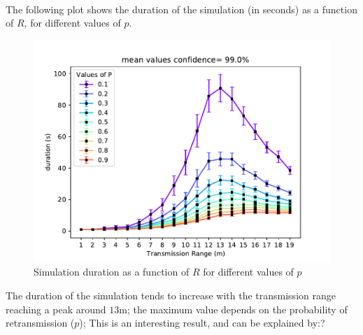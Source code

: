 \\
The following plot shows the duration of the simulation (in seconds) as a
function of $R$, for different values of $p$.
\begin{figure}[H]
    \begin{center}
        \includegraphics[scale=.7]{img/Big_DurRange_mean.pdf}
    \end{center}
    \vspace*{-0.5cm}
    \caption{Simulation duration as a function of $R$ for different values of $p$}
    \label{fig:floorplancoverage4}
\end{figure}
\noindent
The duration of the simulation tends to increase with the transmission range
reaching a peak around $13$m; the maximum value depends on the probability of
retransmission ($p$);
This is an interesting result, and can be explained by:?%
